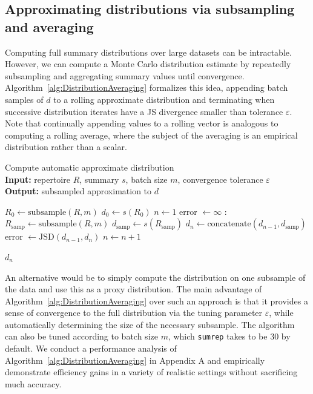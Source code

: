 \documentclass{article}
\begin{document}
\subsection*{Approximating distributions via subsampling and averaging}
Computing full summary distributions over large datasets can be intractable.
However, we can compute a Monte Carlo distribution estimate by repeatedly subsampling and aggregating summary values until convergence.
Algorithm~\ref{alg:DistributionAveraging} formalizes this idea, appending batch samples of $d$ to a rolling approximate distribution and terminating when successive distribution iterates have a JS divergence smaller than tolerance $\varepsilon$.
Note that continually appending values to a rolling vector is analogous to computing a rolling average, where the subject of the averaging is an empirical distribution rather than a scalar.
\begin{algorithm}
    \caption{Compute automatic approximate distribution \\
        \textbf{Input:} repertoire $R$, summary $s$, batch size $m$, convergence tolerance $\varepsilon$\\
        \textbf{Output:} subsampled approximation to $d$}
    \label{alg:DistributionAveraging}
    \begin{algorithmic}
        \State $R_0 \gets \text{subsample}(R, m)$
        \State $d_0 \gets s(R_0)$
        \State $n \gets 1$
        \State error $\gets \infty$
        :
        \State $R_\text{samp} \gets \text{subsample}(R, m)$
        \State $d_\text{samp} \gets s(R_\text{samp})$
        \State $d_n \gets \text{concatenate}(d_{n-1}, d_\text{samp})$
        \State error $\gets \text{JSD}(d_{n-1}, d_n)$
        \State $n \gets n + 1$
        \EndWhile
    \end{algorithmic}
    \Return $d_n$
\end{algorithm}

An alternative would be to simply compute the distribution on one subsample of the data and use this as a proxy distribution.
The main advantage of Algorithm~\ref{alg:DistributionAveraging} over such an approach is that it provides a sense of convergence to the full distribution via the tuning parameter $\varepsilon$, while automatically determining the size of the necessary subsample.
The algorithm can also be tuned according to batch size $m$, which \texttt{sumrep} takes to be 30 by default.
We conduct a performance analysis of Algorithm~\ref{alg:DistributionAveraging} in Appendix A and empirically demonstrate efficiency gains in a variety of realistic settings without sacrificing much accuracy.
\end{document}
